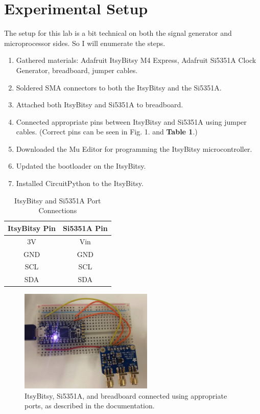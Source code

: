 \documentclass[lettersize,journal]{IEEEtran}
\begin{document}
\section{Experimental Setup}

The setup for this lab is a bit technical on both the signal generator and microprocessor sides. So I will enumerate the steps.

\begin{enumerate}
    \item Gathered materials: Adafruit ItsyBitsy M4 Express, Adafruit Si5351A Clock Generator, breadboard, jumper cables.
    \item Soldered SMA connectors to both the ItsyBitsy and the Si5351A.
    \item Attached both ItsyBitsy and Si5351A to breadboard.
    \item Connected appropriate pins between ItsyBitsy and Si5351A using jumper cables. (Correct pins can be seen in Fig. 1. and {\bf{Table 1}}.)
    \item Downloaded the Mu Editor for programming the ItsyBitsy microcontroller.
    \item Updated the bootloader on the ItsyBitsy.
    \item Installed CircuitPython to the ItsyBitsy.
\end{enumerate}

\begin{table}
\renewcommand{\arraystretch}{2.2}
\begin{center}
\caption{ItsyBitsy and Si5351A Port Connections}
\label{tab1}
\begin{tabular}{c c}
\hline
\bfseries ItsyBitsy Pin & \bfseries Si5351A Pin\\
\hline
3V & Vin\\
\hline
GND & GND\\ 
\hline
SCL & SCL\\
\hline 
SDA& SDA\\
\hline
\end{tabular}
\end{center}
\end{table}

\begin{figure}[!t]
\centering
\includegraphics[width=2.5in]{cables}
\caption{ItsyBitsy, Si5351A, and breadboard connected using appropriate ports, as described in the documentation.}
\label{fig_1}
\end{figure}
\end{document}
